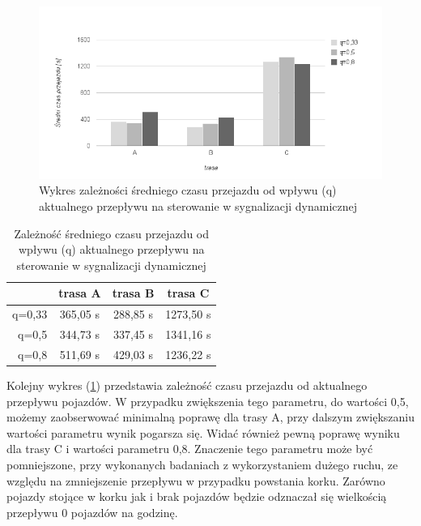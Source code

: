 \FloatBarrier
\begin{figure}[h]
    \centering
    \includegraphics[width=1.0\textwidth]{images/wykres_przeplyw_czas.png}
    \caption{Wykres zależności średniego czasu przejazdu od wpływu (q) aktualnego przepływu na sterowanie w sygnalizacji dynamicznej}
    \label{fig:wykres_przeplyw_czas}
\end{figure}
\FloatBarrier
\begin{table}[h]
	\centering
	\begin{tabular}{ |r|c|c|c| }
		\hline
		& trasa A & trasa B & trasa C \\
		\hline
		q=0,33 & 365,05 s & 288,85 s & 1273,50 s \\
		\hline
		q=0,5 & 344,73 s & 337,45 s & 1341,16 s \\
		\hline
		q=0,8 & 511,69 s & 429,03 s & 1236,22 s \\
		\hline
	\end{tabular}
	\caption{Zależność średniego czasu przejazdu od wpływu (q) aktualnego przepływu na sterowanie w sygnalizacji dynamicznej}
	\label{tab:wykres_przeplyw_czas}
\end{table}
\FloatBarrier
Kolejny wykres (\ref{fig:wykres_przeplyw_czas}) przedstawia zależność czasu przejazdu od aktualnego przepływu pojazdów. W przypadku zwiększenia tego parametru, do wartości 0,5, możemy zaobserwować minimalną poprawę dla trasy A, przy dalszym zwiększaniu wartości parametru wynik pogarsza się.
Widać również pewną poprawę wyniku dla trasy C i wartości parametru 0,8.
Znaczenie tego parametru może być pomniejszone, przy wykonanych badaniach z wykorzystaniem dużego ruchu, ze względu na zmniejszenie przepływu w przypadku powstania korku. Zarówno pojazdy stojące w korku jak i brak pojazdów będzie odznaczał się wielkością przepływu 0 pojazdów na godzinę.

